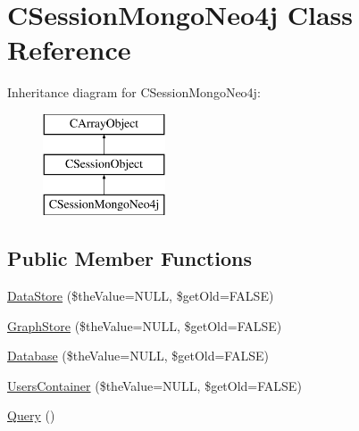 \hypertarget{class_c_session_mongo_neo4j}{\section{C\-Session\-Mongo\-Neo4j Class Reference}
\label{class_c_session_mongo_neo4j}
}
Inheritance diagram for C\-Session\-Mongo\-Neo4j\-:\begin{figure}[H]
\begin{center}
\leavevmode
\includegraphics[height=3.000000cm]{class_c_session_mongo_neo4j}
\end{center}
\end{figure}
\subsection*{Public Member Functions}
\begin{DoxyCompactItemize}
\item 
\hyperlink{class_c_session_mongo_neo4j_af286bc524ded3db59800bb5e585b0a58}{Data\-Store} (\$the\-Value=N\-U\-L\-L, \$get\-Old=F\-A\-L\-S\-E)
\item 
\hyperlink{class_c_session_mongo_neo4j_aa5e06288fa3a285675da6ba8a2b281d5}{Graph\-Store} (\$the\-Value=N\-U\-L\-L, \$get\-Old=F\-A\-L\-S\-E)
\item 
\hyperlink{class_c_session_mongo_neo4j_ada4d97ca5fb8a3f205517032856a6c1a}{Database} (\$the\-Value=N\-U\-L\-L, \$get\-Old=F\-A\-L\-S\-E)
\item 
\hyperlink{class_c_session_mongo_neo4j_a705c05fae227d70ca244d018b15a6bd4}{Users\-Container} (\$the\-Value=N\-U\-L\-L, \$get\-Old=F\-A\-L\-S\-E)
\item 
\hyperlink{class_c_session_mongo_neo4j_a1362c95656d103b12a04a16bb3b43061}{Query} ()
\end{DoxyCompactItemize}
